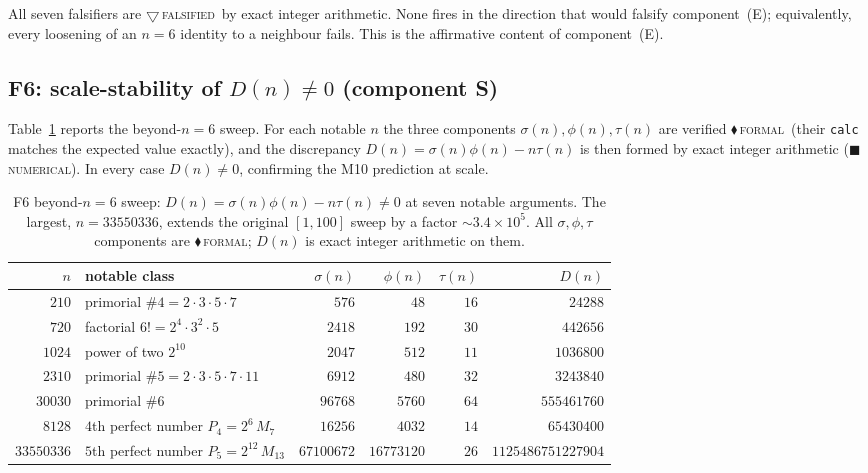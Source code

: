 \documentclass[11pt,a4paper]{article}
\newcommand{\sig}{\sigma}
\newcommand{\Dn}{D(n)}
\newcommand{\tierF}{\textcolor{blue!60!black}{$\blacklozenge$}\,\textsc{formal}}
\newcommand{\tierN}{\textcolor{green!45!black}{$\blacksquare$}\,\textsc{numerical}}
\newcommand{\tierR}{\textcolor{red!70!black}{$\bigtriangledown$}\,\textsc{falsified}}
\theoremstyle{definition}
\begin{document}
All seven falsifiers are \tierR\ by exact integer arithmetic. None fires in the
direction that would falsify component~(E); equivalently, every loosening of an
$n=6$ identity to a neighbour fails. This is the affirmative content of
component~(E).

\subsection{F6: scale-stability of $\Dn\neq0$ (component S)}
\label{sec:verif-f6}

Table~\ref{tab:f6} reports the beyond-$n=6$ sweep. For each notable $n$ the three
components $\sig(n),\phi(n),\tau(n)$ are verified \tierF\ (their \texttt{calc}
matches the expected value exactly), and the discrepancy
$\Dn=\sig(n)\phi(n)-n\tau(n)$ is then formed by exact integer arithmetic
(\tierN). In every case $\Dn\neq0$, confirming the M10 prediction at scale.

\begin{table}[h]
\centering
\caption{F6 beyond-$n=6$ sweep: $\Dn=\sig(n)\phi(n)-n\tau(n)\neq0$ at seven
notable arguments. The largest, $n=33550336$, extends the original $[1,100]$
sweep by a factor $\sim\!3.4\times10^{5}$. All $\sig,\phi,\tau$ components are
\tierF; $\Dn$ is exact integer arithmetic on them.}
\label{tab:f6}
\small
\begin{tabular}{@{}rlrrrr@{}}
\toprule
$n$ & \textbf{notable class} & $\sig(n)$ & $\phi(n)$ & $\tau(n)$ & $\Dn$ \\
\midrule
$210$       & primorial $\#4 = 2\cdot3\cdot5\cdot7$        & $576$      & $48$       & $16$ & $24288$ \\
$720$       & factorial $6! = 2^4\cdot3^2\cdot5$           & $2418$     & $192$      & $30$ & $442656$ \\
$1024$      & power of two $2^{10}$                        & $2047$     & $512$      & $11$ & $1036800$ \\
$2310$      & primorial $\#5 = 2\cdot3\cdot5\cdot7\cdot11$ & $6912$     & $480$      & $32$ & $3243840$ \\
$30030$     & primorial $\#6$                              & $96768$    & $5760$     & $64$ & $555461760$ \\
$8128$      & $4$th perfect number $P_4=2^6\,M_7$          & $16256$    & $4032$     & $14$ & $65430400$ \\
$33550336$  & $5$th perfect number $P_5=2^{12}\,M_{13}$    & $67100672$ & $16773120$ & $26$ & $1125486751227904$ \\
\bottomrule
\end{tabular}
\end{table}
\end{document}
